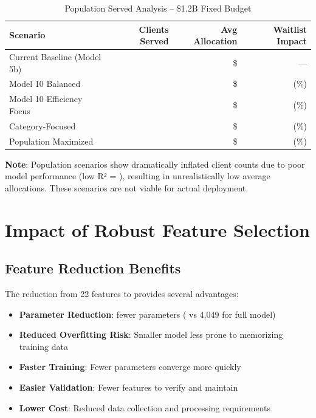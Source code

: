 \begin{table}[h]
\centering
\caption{Population Served Analysis -- \$1.2B Fixed Budget}
\begin{tabular}{lrrr}
\toprule
\textbf{Scenario} & \textbf{Clients Served} & \textbf{Avg Allocation} & \textbf{Waitlist Impact} \\
\midrule
Current Baseline (Model 5b) & \ModelTenPopcurrentbaselineClients{} & \$\ModelTenPopcurrentbaselineAvgAlloc{} & --- \\
Model 10 Balanced & \ModelTenPopmodelbalancedClients{} & \$\ModelTenPopmodelbalancedAvgAlloc{} & \ModelTenPopmodelbalancedWaitlistChange{} (\ModelTenPopmodelbalancedWaitlistPct{}\%) \\
Model 10 Efficiency Focus & \ModelTenPopmodelefficiencyClients{} & \$\ModelTenPopmodelefficiencyAvgAlloc{} & \ModelTenPopmodelefficiencyWaitlistChange{} (\ModelTenPopmodelefficiencyWaitlistPct{}\%) \\
Category-Focused & \ModelTenPopcategoryfocusedClients{} & \$\ModelTenPopcategoryfocusedAvgAlloc{} & \ModelTenPopcategoryfocusedWaitlistChange{} (\ModelTenPopcategoryfocusedWaitlistPct{}\%) \\
Population Maximized & \ModelTenPoppopulationmaximizedClients{} & \$\ModelTenPoppopulationmaximizedAvgAlloc{} & \ModelTenPoppopulationmaximizedWaitlistChange{} (\ModelTenPoppopulationmaximizedWaitlistPct{}\%) \\
\bottomrule
\end{tabular}
\end{table}

\textbf{Note}: Population scenarios show dramatically inflated client counts due to poor model performance (low R² = \ModelTenRSquaredTest{}), resulting in unrealistically low average allocations. These scenarios are not viable for actual deployment.

\section{Impact of Robust Feature Selection}

\subsection{Feature Reduction Benefits}

The \ModelTenFeatureReduction{} reduction from 22 features to \ModelTenRobustFeatures{} provides several advantages:

\begin{itemize}
    \item \textbf{Parameter Reduction}: \ModelTenParameterReduction{} fewer parameters (\ModelTenTotalParams{} vs 4,049 for full model)
    \item \textbf{Reduced Overfitting Risk}: Smaller model less prone to memorizing training data
    \item \textbf{Faster Training}: Fewer parameters converge more quickly
    \item \textbf{Easier Validation}: Fewer features to verify and maintain
    \item \textbf{Lower Cost}: Reduced data collection and processing requirements
\end{itemize}

